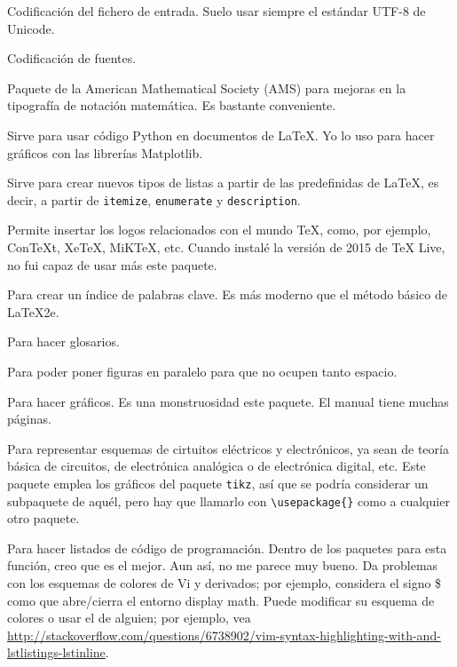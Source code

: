 \begin{desc-package}
  \item[inputenc] Codificación del fichero de entrada. Suelo usar siempre el estándar UTF-8 de Unicode.

  \item[fontenc] Codificación de fuentes.

  \item[titling]

  \item[amsmath] Paquete de la American Mathematical Society (AMS) para mejoras en la tipografía de notación
    matemática. Es bastante conveniente.

  \item[python] Sirve para usar código Python en documentos de \LaTeX{}. Yo lo uso para hacer gráficos con las
    librerías Matplotlib.

  \item[enumitem] Sirve para crear nuevos tipos de listas a partir de las predefinidas de \LaTeX{}, es decir, a
    partir de \lstinline!itemize!, \lstinline!enumerate! y \lstinline!description!.

  \item[dtklogos] Permite insertar los logos relacionados con el mundo \TeX{}, como, por ejemplo, ConTeXt,
    XeTeX, MiKTeX, etc. Cuando instalé la versión de 2015 de \TeX{} Live, no fui capaz de usar más este paquete.

  \item[imakeidx] Para crear un índice de palabras clave. Es más moderno que el método básico de \LaTeX{}2e.

  \item[glossaries] Para hacer glosarios.

  \item[floatrow] Para poder poner figuras en paralelo para que no ocupen tanto espacio.

  \item[tikz] Para hacer gráficos. Es una monstruosidad este paquete. El manual tiene muchas páginas.

  \item[circuitikz] Para representar esquemas de cirtuitos eléctricos y electrónicos, ya sean de teoría básica
    de circuitos, de electrónica analógica o de electrónica digital, etc. Este paquete emplea los gráficos del
    paquete \lstinline!tikz!, así que se podría considerar un subpaquete de aquél, pero hay que llamarlo con
    \lstinline+\usepackage{}+ como a cualquier otro paquete.

  \item[listings] Para hacer listados de código de programación. Dentro de los paquetes para esta función, creo
    que es el mejor. Aun así, no me parece muy bueno. Da problemas con los esquemas de colores de Vi y
    derivados; por ejemplo, considera el signo \$ como que abre/cierra el entorno display math. Puede modificar
    su esquema de colores o usar el de alguien; por ejemplo, vea
    \url{http://stackoverflow.com/questions/6738902/vim-syntax-highlighting-with-and-lstlistings-lstinline}.

\end{desc-package}
